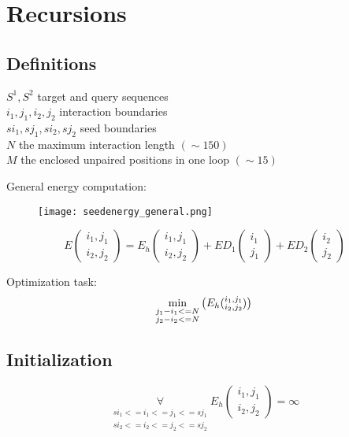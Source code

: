 \section{Recursions}

\subsection{Definitions}

$S^1, S^2$ target and query sequences\\
$i_1, j_1, i_2, j_2$ interaction boundaries\\
$si_1, sj_1, si_2, sj_2$ seed boundaries\\
$N$ the maximum interaction length $(\sim 150)$\\
$M$ the enclosed unpaired positions in one loop $(\sim 15)$

General energy computation:

\begin{figure}[H]
	\centering
	\texttt{[image: seedenergy\_general.png]}
\end{figure}

\begin{equation*}
E(\substack{i_1,j_1\\i_2,j_2}) = E_{h}(\substack{i_1,j_1\\i_2,j_2}) + ED_{1}(\substack{i_1\\j_1}) + ED_{2}(\substack{i_2\\j_2})
\end{equation*}

Optimization task:
\begin{equation*}
\min\limits_{\substack{j_{1}-i_{1} <= N\\j_{2}-i_{2} <= N}}
\begin{pmatrix}
E_{h}(\substack{i_1,j_1\\i_2,j_2})
\end{pmatrix}\\
\end{equation*}

\subsection{Initialization}

\begin{equation*}
\underset{{\substack{si_1 <= i_{1} <= j_{1} <= sj_{1}\\si_2 <= i_{2} <= j_{2} <= sj_{2}}}}{\forall} E_h(\substack{i_1,j_1\\i_2,j_2}) = \infty
\end{equation*}

